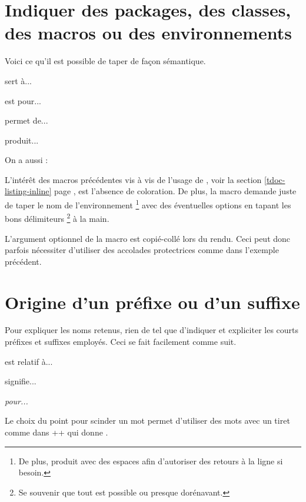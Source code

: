 \documentclass[10pt, a4paper]{article}
\begin{document}
\section{Indiquer des packages, des classes, des macros ou des environnements}

Voici ce qu'il est possible de taper de façon sémantique.


\begin{tdoclatex}[sbs]
 sert à...

 est pour...

 permet de...

 produit...

On a aussi :

\end{tdoclatex}


\begin{tdocrem}
    L'intérêt des macros précédentes vis à vis de l'usage de , voir la section \ref{tdoc-listing-inline} page \pageref{tdoc-listing-inline}, est l'absence de coloration.
    De plus, la macro  demande juste de taper le nom de l'environnement
    \footnote{
        De plus,  produit  avec des espaces afin d'autoriser des retours à la ligne si besoin.
    }
    avec des éventuelles options en tapant les bons délimiteurs
    \footnote{
        Se souvenir que tout est possible ou presque dorénavant.
    }
    à la main.
\end{tdocrem}


\begin{tdocwarn}
    L'argument optionnel de la macro  est copié-collé lors du rendu. Ceci peut donc parfois nécessiter d'utiliser des accolades protectrices comme dans l'exemple précédent.
\end{tdocwarn}




\section{Origine d'un préfixe ou d'un suffixe}

Pour expliquer les noms retenus, rien de tel que d'indiquer et expliciter les courts préfixes et suffixes employés. Ceci se fait facilement comme suit.


\begin{tdoclatex}[sbs]
 est relatif à...

 signifie...

\emph{ pour...}
\end{tdoclatex}


\begin{tdocrem}
    Le choix du point pour scinder un mot permet d'utiliser des mots avec un tiret comme dans \tdocinlatex++ qui donne .
\end{tdocrem}
\end{document}
